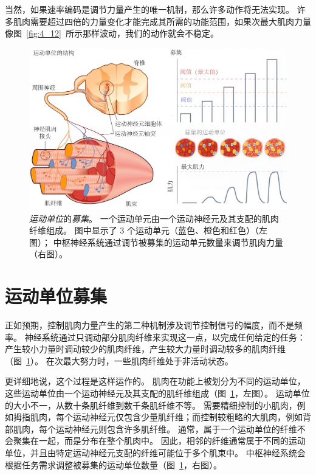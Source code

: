 当然，如果速率编码是调节力量产生的唯一机制，那么许多动作将无法实现。
许多肌肉需要超过四倍的力量变化才能完成其所需的功能范围，如果次最大肌肉力量像图~\ref{fig:4_12}~所示那样波动，我们的动作就会不稳定。


\begin{figure}[!htb]
	\centering
	\includegraphics[width=1.0\linewidth]{chap4/4_13}
	\caption{\textit{运动单位}的\textit{募集}。
		一个运动单元由一个运动神经元及其支配的肌肉纤维组成。
		图中显示了 3 个运动单元（蓝色、橙色和红色）（左图）；
		中枢神经系统通过调节被募集的运动单元数量来调节肌肉力量（右图）。 \label{fig:4_13}}
\end{figure}


\section{运动单位募集}

正如预期，控制肌肉力量产生的第二种机制涉及调节控制信号的幅度，而不是频率。
神经系统通过只调动部分肌肉纤维来实现这一点，以完成任何给定的任务：产生较小力量时调动较少的肌肉纤维，产生较大力量时调动较多的肌肉纤维（图~\ref{fig:4_13}）。
在次最大努力时，一些肌肉纤维处于非活动状态。


更详细地说，这个过程是这样运作的。
肌肉在功能上被划分为不同的运动单位，这些运动单位由一个运动神经元及其支配的肌纤维组成（图~\ref{fig:4_13}，左图）。
运动单位的大小不一，从数十条肌纤维到数千条肌纤维不等。
需要精细控制的小肌肉，例如拇指肌肉，每个运动神经元仅包含少量肌纤维；而控制较粗略的大肌肉，例如背部肌肉，每个运动神经元则包含许多肌纤维。
通常，属于一个运动单位的纤维不会聚集在一起，而是分布在整个肌肉中。
因此，相邻的纤维通常属于不同的运动单位，并且由特定运动神经元支配的纤维可能位于多个肌束中。
中枢神经系统会根据任务需求调整被募集的运动单位数量（图~\ref{fig:4_13}，右图）。


